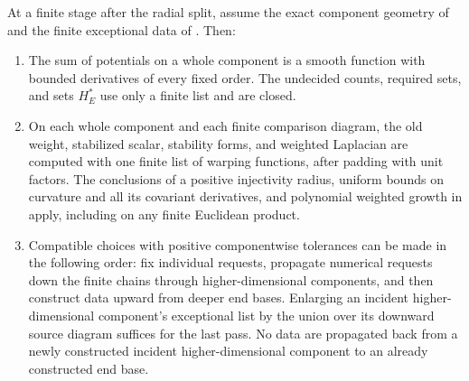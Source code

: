 \begin{lemma}\label{countable:locality}
At a finite stage after the radial split, assume the exact component
geometry of  and the finite exceptional data of
. Then:
\begin{enumerate}[label=(\roman*),leftmargin=*]
\item The sum of potentials on a whole component is a smooth function
with bounded derivatives of every fixed order. The undecided counts,
required sets, and sets $H_E^*$ use only a finite list and are closed.
\item On each whole component and each finite comparison diagram, the old
weight, stabilized scalar, stability forms, and weighted Laplacian are
computed with one finite list of warping functions, after padding with unit factors.
The conclusions of a positive injectivity radius, uniform bounds on
curvature and all its covariant derivatives, and polynomial weighted growth in
 apply, including on any finite Euclidean product.
\item Compatible choices with positive componentwise tolerances can be
made in the following order: fix individual requests, propagate numerical
requests down the finite chains through higher-dimensional components, and then construct data upward
from deeper end bases. Enlarging an incident higher-dimensional component's exceptional list by the union
over its downward source diagram suffices for the last pass. No data
are propagated back from a newly constructed incident higher-dimensional component to an already
constructed end base.
\end{enumerate}
\end{lemma}

